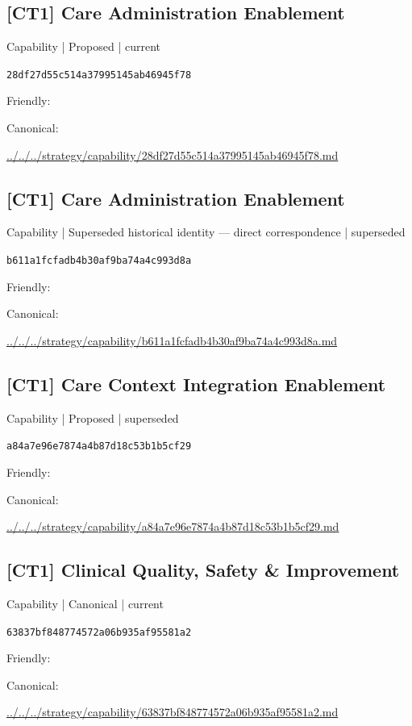 \documentclass[10pt,a4paper]{article}
\begin{document}
\subsection*{[CT1] Care Administration Enablement}
{\small Capability | Proposed | current}\par
\texttt{28df27d55c514a37995145ab46945f78}\par
Friendly: \par
Canonical: \par
{\footnotesize\url{../../../strategy/capability/28df27d55c514a37995145ab46945f78.md}}\par
\subsection*{[CT1] Care Administration Enablement}
{\small Capability | Superseded historical identity — direct correspondence | superseded}\par
\texttt{b611a1fcfadb4b30af9ba74a4c993d8a}\par
Friendly: \par
Canonical: \par
{\footnotesize\url{../../../strategy/capability/b611a1fcfadb4b30af9ba74a4c993d8a.md}}\par
\subsection*{[CT1] Care Context Integration Enablement}
{\small Capability | Proposed | superseded}\par
\texttt{a84a7e96e7874a4b87d18c53b1b5cf29}\par
Friendly: \par
Canonical: \par
{\footnotesize\url{../../../strategy/capability/a84a7e96e7874a4b87d18c53b1b5cf29.md}}\par
\subsection*{[CT1] Clinical Quality, Safety \& Improvement}
{\small Capability | Canonical | current}\par
\texttt{63837bf848774572a06b935af95581a2}\par
Friendly: \par
Canonical: \par
{\footnotesize\url{../../../strategy/capability/63837bf848774572a06b935af95581a2.md}}\par
\end{document}
